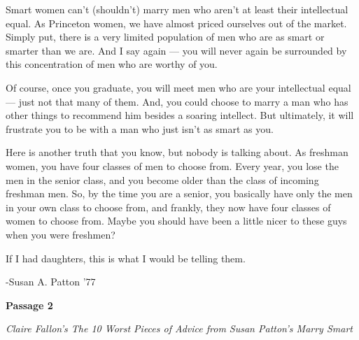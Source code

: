 \begin{linenumbers*}
\indent Smart women can't (shouldn't) marry men who aren't at least their intellectual equal. As Princeton women, we have almost priced ourselves out of the market. Simply put, there is a very limited population of men who are as smart or smarter than we are. And I say again — you will never again be surrounded by this concentration of men who are worthy of you.

\indent Of course, once you graduate, you will meet men who are your intellectual equal — just not that many of them. And, you could choose to marry a man who has other things to recommend him besides a soaring intellect. But ultimately, it will frustrate you to be with a man who just isn't as smart as you.

\indent Here is another truth that you know, but nobody is talking about. As freshman women, you have four classes of men to choose from. Every year, you lose the men in the senior class, and you become older than the class of incoming freshman men. So, by the time you are a senior, you basically have only the men in your own class to choose from, and frankly, they now have four classes of women to choose from. Maybe you should have been a little nicer to these guys when you were freshmen?

\bigskip
If I had daughters, this is what I would be telling them.
\end{linenumbers*}

-Susan A. Patton '77

\bigskip
\textbf{Passage 2}

\textit{Claire Fallon's The 10 Worst Pieces of Advice from Susan Patton's Marry Smart}

